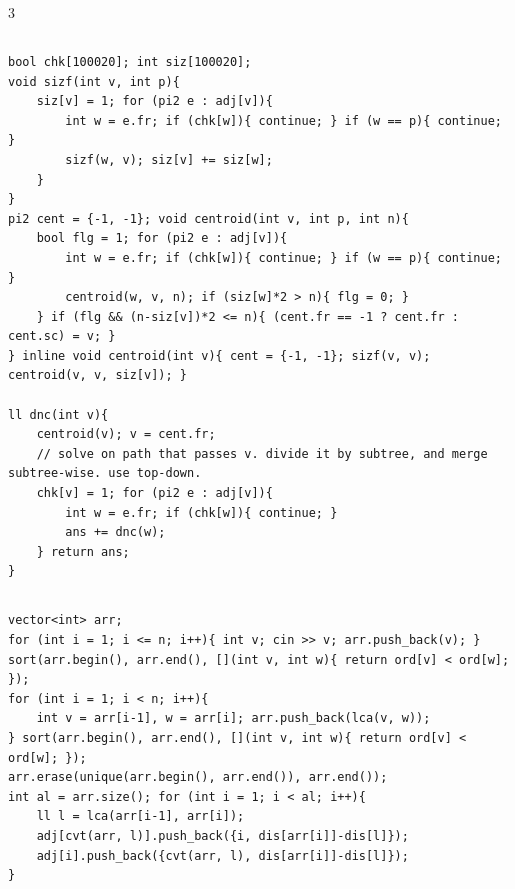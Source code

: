 \documentclass[landscape, 8pt, a4paper, oneside]{extarticle}
\begin{document}
\begin{multicols*}{3}
\subsection{}
\begin{verbatim}
bool chk[100020]; int siz[100020];
void sizf(int v, int p){
	siz[v] = 1; for (pi2 e : adj[v]){
		int w = e.fr; if (chk[w]){ continue; } if (w == p){ continue; }
		sizf(w, v); siz[v] += siz[w];
	}
}
pi2 cent = {-1, -1}; void centroid(int v, int p, int n){
	bool flg = 1; for (pi2 e : adj[v]){
		int w = e.fr; if (chk[w]){ continue; } if (w == p){ continue; }
		centroid(w, v, n); if (siz[w]*2 > n){ flg = 0; }
	} if (flg && (n-siz[v])*2 <= n){ (cent.fr == -1 ? cent.fr : cent.sc) = v; }
} inline void centroid(int v){ cent = {-1, -1}; sizf(v, v); centroid(v, v, siz[v]); }

ll dnc(int v){
	centroid(v); v = cent.fr;
	// solve on path that passes v. divide it by subtree, and merge subtree-wise. use top-down.
	chk[v] = 1; for (pi2 e : adj[v]){
		int w = e.fr; if (chk[w]){ continue; }
		ans += dnc(w);
	} return ans;
}
\end{verbatim}
\subsection{}
\begin{verbatim}
vector<int> arr;
for (int i = 1; i <= n; i++){ int v; cin >> v; arr.push_back(v); }
sort(arr.begin(), arr.end(), [](int v, int w){ return ord[v] < ord[w]; });
for (int i = 1; i < n; i++){
	int v = arr[i-1], w = arr[i]; arr.push_back(lca(v, w));
} sort(arr.begin(), arr.end(), [](int v, int w){ return ord[v] < ord[w]; });
arr.erase(unique(arr.begin(), arr.end()), arr.end());
int al = arr.size(); for (int i = 1; i < al; i++){
	ll l = lca(arr[i-1], arr[i]);
	adj[cvt(arr, l)].push_back({i, dis[arr[i]]-dis[l]});
	adj[i].push_back({cvt(arr, l), dis[arr[i]]-dis[l]});
}
\end{verbatim}

\end{multicols*}
\end{document}
